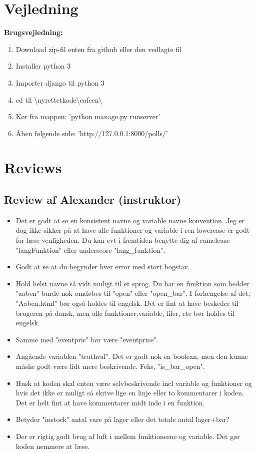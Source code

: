 \documentclass[]{article}
\begin{document}
\section{Vejledning}
\textbf{Brugsvejledning:}
\begin{enumerate}
    \item Download zip-fil enten fra github eller den vedlagte fil
    \item Installer python 3
    \item Importer django til python 3
    \item cd til \textbackslash nyrettetkode\textbackslash cafeen\textbackslash
    \item Kør fra mappen: 'python manage.py runserver'
    \item Åben følgende side: 'http://127.0.0.1:8000/polls/'
\end{enumerate}
    
\section{Reviews} \label{BilagReviews}
\subsection{Review af Alexander (instruktor)}
\begin{itemize}
	\item Det er godt at se en konsistent navne og variable navne konvention. Jeg er dog ikke sikker på at have alle funktioner og variable i ren lowercase er godt for læse venligheden. Du kan evt i fremtiden benytte dig af camelcase "langFunktion" eller underscore "lang\_funktion".
	\item Godt at se at du begynder hver error med stort bogstav. 
	\item Hold helst navne så vidt muligt til et sprog. Du har en funktion som hedder "aaben" burde nok omdøbes til "open" eller "open\_bar". I forlængelse af det, "Aaben.html" bør også holdes til engelsk. Det er fint at have beskeder til brugeren på dansk, men alle funktioner,variable, filer, etc bør holdes til engelsk.
	\item Samme med "eventpris" bør være "eventprice".
	\item Angående variablen "truthval". Det er godt nok en boolean, men den kunne måske godt være lidt mere beskrivende. Feks, "is\_bar\_open".
	\item Husk at koden skal enten være selvbeskrivende incl variable og funktioner og hvis det ikke er muligt så skrive lige en linje eller to kommentarer i koden. Det er helt fint at have kommentarer midt inde i en funktion.
	\item Betyder "instock" antal vare på lager eller det totale antal lager+bar?
	\item Der er rigtig godt brug af luft i mellem funktionerne og variable. Det gør koden nemmere at læse.
\end{itemize} 
\end{document}
